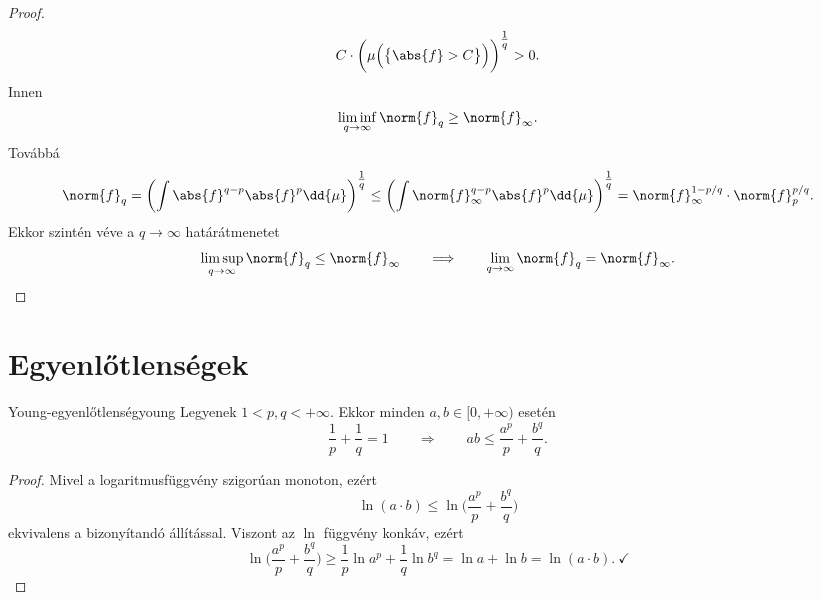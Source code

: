 \documentclass[
]{elteikthesis}[2024/04/26]
\begin{document}
\begin{proof}
\[			C \cdot \biggl( \mu \Bigl( \bigl\{ \abs{f} > C \bigr\} \Bigr) \biggr)^{\tfrac{1}{q}}
			> 0.
		\]
		Innen
		\[
			\liminf_{q \to \infty} \norm{f}_q \geq \norm{f}_\infty.
		\]
		Továbbá
		\[
			\norm{f}_q = 
			\biggl( \int \abs{f}^{q-p} \abs{f}^p \dd{\mu} \biggr)^{\tfrac{1}{q}} \leq
			\biggl( \int \norm{f}_\infty^{q-p} \abs{f}^p \dd{\mu} \biggr)^{\tfrac{1}{q}} =
			\norm{f}_{\infty}^{1 - p/q} \cdot \norm{f}_p^{p/q}.
		\]
		Ekkor szintén véve a \( q \to \infty \) határátmenetet
		\[
			\limsup_{q \to \infty} \norm{f}_q \leq \norm{f}_\infty
			\qquad \Longrightarrow \qquad
			\lim_{q \to \infty} \norm{f}_q = \norm{f}_\infty.
		\]
	\end{proof}
	
	\newpage
	
	\section{Egyenlőtlenségek}
	
	\begin{lemma}{Young-egyenlőtlenség}{young}
		Legyenek \( 1 < p, q < +\infty \). 
		Ekkor minden \( a, b \in [0, +\infty) \) esetén
		\[
			\frac{1}{p} + \frac{1}{q} = 1 
			\qquad \Longrightarrow \qquad
			ab \leq \frac{a^p}{p} + \frac{b^q}{q}.
		\]
	\end{lemma}
	\begin{proof}
		Mivel a logaritmusfüggvény szigorúan monoton, ezért
		\[
			\ln( a \cdot b ) \leq
			\ln \biggl( \frac{a^p}{p} + \frac{b^q}{q} \biggr)
		\]
		ekvivalens a bizonyítandó állítással.
		Viszont az \( \ln \) függvény konkáv, ezért
		\[
			\ln \biggl( \frac{a^p}{p} + \frac{b^q}{q} \biggr) \geq
			\frac{1}{p} \ln a^p + \frac{1}{q} \ln b^q =
			\ln a + \ln b =
			\ln( a \cdot b ). \ \checkmark
		\]
	\end{proof}
	
\end{document}
